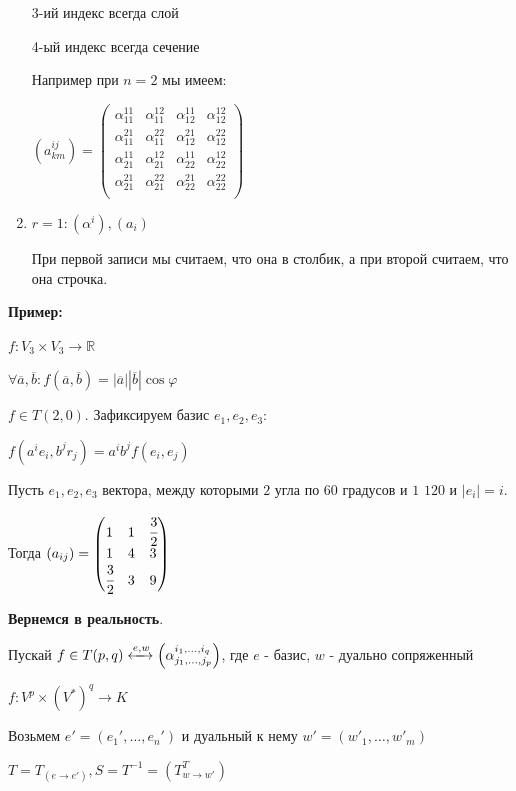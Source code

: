 \begin{enumerate}
3-ий индекс всегда слой

4-ый индекс всегда сечение

Например при $n=2$ мы имеем:

$(a^{ij}_{km}) = \left(
\begin{array}{cc|cc}
  \alpha^{11}_{11} & \alpha^{12}_{11} & \alpha^{11}_{12} & \alpha^{12}_{12} \\
  \alpha^{21}_{11} & \alpha^{22}_{11} & \alpha^{21}_{12} & \alpha^{22}_{12} \\
\hline
  \alpha^{11}_{21} & \alpha^{12}_{21} & \alpha^{11}_{22} & \alpha^{12}_{22} \\
  \alpha^{21}_{21} & \alpha^{22}_{21} & \alpha^{21}_{22} & \alpha^{22}_{22} \\
\end{array}
\right)$


\item $r=1: (\alpha^i), (a_i)$ 

При первой записи мы считаем, что она в столбик, а при второй считаем, что она строчка.

\end{enumerate}


\textbf{Пример:} 

$f:V_3\times V_3 \rightarrow \mathbb{R}$

$\forall \overline{a}, \overline{b}: f(\overline{a},\overline{b}) = |\overline{a}||\overline{b}|\cos \varphi$

$f\in T(2,0)$. Зафиксируем базис $e_1,e_2,e_3$:

$f(a^ie_i,b^jr_j) = a^ib^j f(e_i,e_j)$

Пусть $e_1,e_2,e_3$ вектора, между которыми $2$ угла по $60$ градусов и $1$ $120$  и $|e_i|=i$.

Тогда $(a_{ij})= \begin{pmatrix}
    1 & 1 & \cfrac{3}{2} \\
    1 & 4& 3 \\
    \cfrac{3}{2} & 3 & 9
\end{pmatrix}$


\textbf{Вернемся в реальность}.

Пускай $f \in T(p,q) \xleftrightarrow{e,w} \left(\alpha^{i_1,\ldots,i_q}_{j_1,\ldots,j_p}\right)$, где $e$ - базис, $w$ - дуально сопряженный

$f: V^p \times (V^*)^q\rightarrow K$

Возьмем $e' = (e_1',\ldots,e_n' )$ и дуальный к нему $w'=(w'_1,\ldots, w'_m)$

$T = T_{(e\rightarrow e')}, S = T^{-1} = (T_{w\to w'}^T)$

